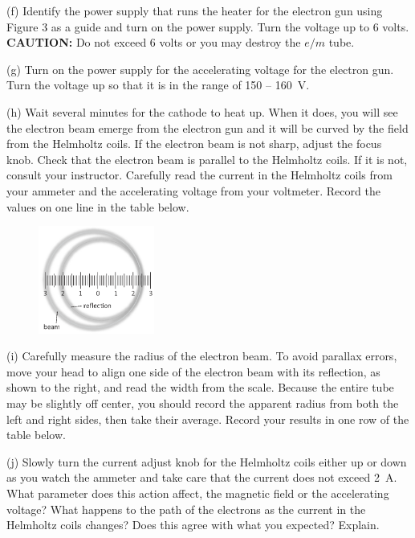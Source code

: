 (f) Identify the power supply that runs the heater for the electron gun using 
Figure 3 as a guide and turn on the power supply. Turn the voltage up to 
6 volts. {\bf CAUTION:} Do not exceed 6 volts or you may destroy the $e/m$
tube.

(g) Turn on the power supply for the accelerating voltage for the electron gun.
Turn the voltage up so that it is in the range of 150 -- 160~V.

(h) Wait several minutes for the cathode to heat up. When
it does, you will see the electron beam emerge from
the electron gun and it will be curved by the field from
the Helmholtz coils. If the electron beam is not sharp, adjust the focus knob. 
Check that the electron beam is
parallel to the Helmholtz coils. If it is not, consult your instructor.
 Carefully read the current in the Helmholtz coils from
your ammeter and the accelerating voltage from your
voltmeter. Record the values on one line in the table below.
\vspace{15mm}

\begin{figure}
\vspace{-0.5in}
\begin{raggedleft}
\includegraphics[width=0.34\textwidth]{eoverm/aligning_beam_and_reflection.eps}
\end{raggedleft}
\end{figure}
(i) Carefully measure the radius of the electron beam.
To avoid parallax errors, move your head to align one side of the electron
beam with its reflection, as shown to the right, and read the width from the scale.
Because the entire tube may be slightly off center, you should record the apparent radius from both the left and right sides, then take their average. 
Record your results in one row of the table below.
\vspace{20mm}

(j) Slowly turn the current adjust knob for the Helmholtz
coils either up or down as you watch the ammeter and take care that
the current does not exceed 2~A.
What parameter does this action affect, the magnetic field or the
accelerating voltage?
What happens to the path of the electrons as the current in the Helmholtz
coils changes? Does this agree with what you expected? Explain.
\vspace{20mm}

